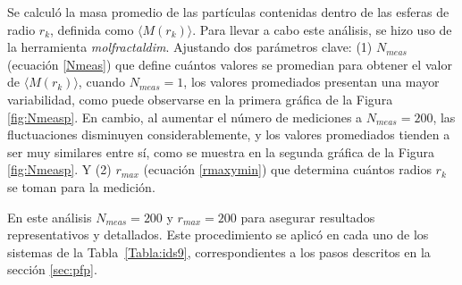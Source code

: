 	Se calcul\'{o} la masa promedio de las part\'{i}culas 
	contenidas dentro de las esferas de radio $r_k$, definida 
	como $\langle M(r_{k}) \rangle$. 
	Para llevar a cabo este an\'{a}lisis, se hizo uso de la 
	herramienta \textit{molfractaldim}. Ajustando dos par\'{a}metros
	clave: (1) $N_{meas}$ (ecuaci\'{o}n \ref{Nmeas}) que define cu\'{a}ntos 
	valores se promedian para obtener el valor de $\langle M(r_{k}) \rangle$,
	cuando $N_{meas} = 1$, los valores promediados presentan una mayor 
	variabilidad, como puede observarse en la primera gr\'{a}fica de la 
	Figura \ref{fig:Nmeasp}. En cambio, al aumentar el n\'{u}mero de mediciones 
	a $N_{meas} = 200$, las fluctuaciones disminuyen considerablemente,
	 y los valores promediados tienden a ser muy similares entre s\'{i}, como se 
	 muestra en la segunda gr\'{a}fica de la Figura \ref{fig:Nmeasp}.
	 Y (2) $r_{max}$ (ecuaci\'{o}n \ref{rmaxymin}) que determina 
	cu\'{a}ntos radios $r_{k}$ se toman para la medici\'{o}n.
	
	En este an\'{a}lisis $N_{meas} = 200 $ y $r_{max} = 200$ para asegurar resultados 
	representativos y detallados. Este procedimiento se aplic\'{o} en cada uno 
	de los sistemas de la Tabla~\ref{Tabla:ids9}, correspondientes a 
	los pasos descritos en la secci\'{o}n \ref{sec:pfp}.
	

